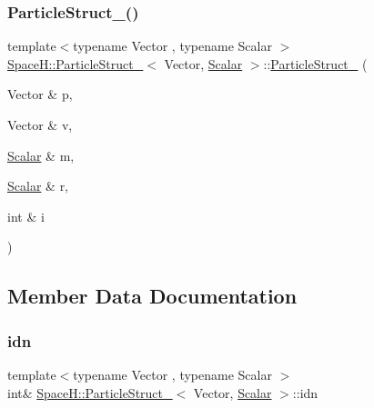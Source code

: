 \subsubsection{\texorpdfstring{Particle\+Struct\+\_\+()}{ParticleStruct\_()}\hspace{0.1cm}{\footnotesize\ttfamily [2/2]}}
{\footnotesize\ttfamily template$<$typename Vector , typename Scalar $>$ \\
\mbox{\hyperlink{struct_space_h_1_1_particle_struct__}{Space\+H\+::\+Particle\+Struct\+\_\+}}$<$ Vector, \mbox{\hyperlink{create_kepler_8cpp_a8c2981f3f834be9448a6ab06c28748eb}{Scalar}} $>$\+::\mbox{\hyperlink{struct_space_h_1_1_particle_struct__}{Particle\+Struct\+\_\+}} (\begin{DoxyParamCaption}\item[{Vector \&}]{p,  }\item[{Vector \&}]{v,  }\item[{\mbox{\hyperlink{create_kepler_8cpp_a8c2981f3f834be9448a6ab06c28748eb}{Scalar}} \&}]{m,  }\item[{\mbox{\hyperlink{create_kepler_8cpp_a8c2981f3f834be9448a6ab06c28748eb}{Scalar}} \&}]{r,  }\item[{int \&}]{i }\end{DoxyParamCaption})\hspace{0.3cm}{\ttfamily [inline]}}



\subsection{Member Data Documentation}
\mbox{\label{struct_space_h_1_1_particle_struct___a4e1ffe43fb4118732fb301cd6029712e}} 
\subsubsection{\texorpdfstring{idn}{idn}}
{\footnotesize\ttfamily template$<$typename Vector , typename Scalar $>$ \\
int\& \mbox{\hyperlink{struct_space_h_1_1_particle_struct__}{Space\+H\+::\+Particle\+Struct\+\_\+}}$<$ Vector, \mbox{\hyperlink{create_kepler_8cpp_a8c2981f3f834be9448a6ab06c28748eb}{Scalar}} $>$\+::idn}

\mbox{\label{struct_space_h_1_1_particle_struct___a51b155f67fbf98f5cf0dbf1231ad0d5f}} 
